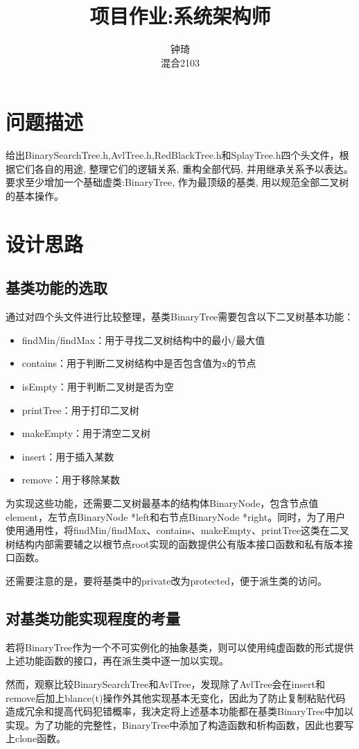 \documentclass[UTF8]{ctexart}
\title{项目作业:系统架构师 }
\author{钟琦 \\ 混合2103\quad3210103612}
\begin{document}
\maketitle
\section{问题描述}
给出BinarySearchTree.h,AvlTree.h,RedBlackTree.h和SplayTree.h四个头文件，根据它们各自的用途, 整理它们的逻辑关系, 重构全部代码, 并用继承关系予以表达。要求至少增加一个基础虚类:BinaryTree, 作为最顶级的基类, 用以规范全部二叉树的基本操作。
\section{设计思路}
\subsection{基类功能的选取}
通过对四个头文件进行比较整理，基类BinaryTree需要包含以下二叉树基本功能：\par
\begin{itemize}
    \item findMin/findMax：用于寻找二叉树结构中的最小/最大值
    \item contains：用于判断二叉树结构中是否包含值为x的节点
    \item isEmpty：用于判断二叉树是否为空
    \item printTree：用于打印二叉树
    \item makeEmpty：用于清空二叉树
    \item insert：用于插入某数
    \item remove：用于移除某数
\end{itemize}
为实现这些功能，还需要二叉树最基本的结构体BinaryNode，包含节点值element，左节点BinaryNode *left和右节点BinaryNode *right。同时，为了用户使用通用性，将findMin/findMax、contains、makeEmpty、printTree这类在二叉树结构内部需要辅之以根节点root实现的函数提供公有版本接口函数和私有版本接口函数。\par
还需要注意的是，要将基类中的private改为protected，便于派生类的访问。
\subsection{对基类功能实现程度的考量}
若将BinaryTree作为一个不可实例化的抽象基类，则可以使用纯虚函数的形式提供上述功能函数的接口，再在派生类中逐一加以实现。\par
然而，观察比较BinarySearchTree和AvlTree，发现除了AvlTree会在insert和remove后加上blance(t)操作外其他实现基本无变化，因此为了防止复制粘贴代码造成冗余和提高代码犯错概率，我决定将上述基本功能都在基类BinaryTree中加以实现。为了功能的完整性，BinaryTree中添加了构造函数和析构函数，因此也要写上clone函数。
\end{document}

